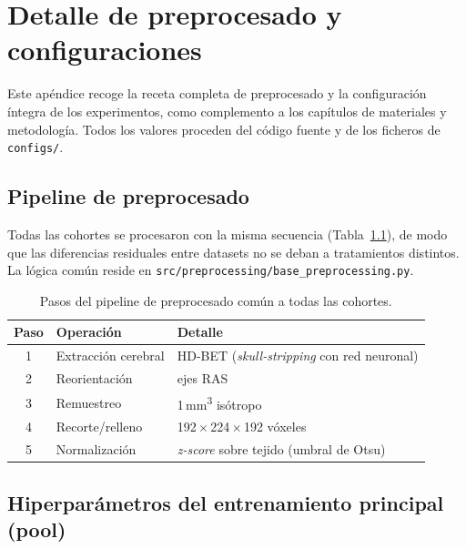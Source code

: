 \appendix

\chapter{Detalle de preprocesado y configuraciones}

Este apéndice recoge la receta completa de preprocesado y la configuración íntegra
de los experimentos, como complemento a los capítulos de materiales y metodología.
Todos los valores proceden del código fuente y de los ficheros de
\texttt{configs/}.

\section{Pipeline de preprocesado}

Todas las cohortes se procesaron con la misma secuencia
(Tabla~\ref{tab:apx_preproc}), de modo que las diferencias residuales entre
datasets no se deban a tratamientos distintos. La lógica común reside en
\texttt{src/preprocessing/base\_preprocessing.py}.

\begin{table}[ht]
  \centering
  \caption[Pasos del pipeline de preprocesado]{Pasos del pipeline de preprocesado
  común a todas las cohortes.}
  \label{tab:apx_preproc}
  \begin{tabular}{c l l}
    \hline
    \textbf{Paso} & \textbf{Operación} & \textbf{Detalle} \\
    \hline
    1 & Extracción cerebral   & HD-BET (\emph{skull-stripping} con red neuronal) \\
    2 & Reorientación         & ejes RAS \\
    3 & Remuestreo            & 1\,mm\textsuperscript{3} isótropo \\
    4 & Recorte/relleno       & 192\,$\times$\,224\,$\times$\,192 vóxeles \\
    5 & Normalización         & \emph{z-score} sobre tejido (umbral de Otsu) \\
    \hline
  \end{tabular}
\end{table}

\section{Hiperparámetros del entrenamiento principal (pool)}

